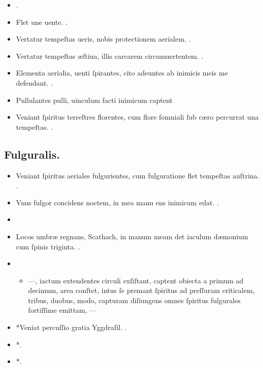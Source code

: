 \documentclass[12pt]{book}
\newcommand{\reconst}{*}
\begin{document}
\begin{itemize}
  \item {}.
  \item Flet une uente. .
  \item Vertatur tempeſtas ueris, nobis protectionem aerialem. .
  \item Vertatur tempeſtas æſtiua, illis carcarem circumuertentem. .
  \item Elementa aerialia, uenti ſpirantes, cito adeuntes ab inimicis meis me defendant. .
  \item Pullulantes pulli, uinculum facti inimicum captent \textelp{}
  \item Veniant ſpiritus terreſtres florentes,
        cum flore ſomniali ſub cæro percurrat una tempeſtas.
        .
\end{itemize}

\subsection{Fulguralis.}\label{fulguralis}

\begin{itemize}
  \item Veniant ſpiritus aeriales fulgurientes,
        cum fulguratione flet tempeſtas auſtrina.
        .
  \item Vnus fulgor concidens noctem, in mea manu ens inimicum edat. .
  \item {}
  \item Locos umbræ regnans, Scathach,
        in manum meam det iaculum dæmonium cum ſpinis triginta. .
  \item {}
  \begin{itemize}
    \item ---, iactum extendentes circuli exſiſtant,
          captent obiecta a primum ad decimum, area conſtet,
          intus ſe premant ſpiritus ad preſſuram criticalem,
          tribus, duobus, modo,
          capturam diſiungens omnes ſpiritus fulgurales fortiſſime emittam,
          ---
  \end{itemize}
  \item \reconst{}Veniat percuſſio gratia Yggdraſil.
        .
  \item \reconst{}. %
  \item \reconst{}. %
\end{itemize}
\end{document}
